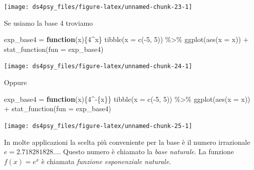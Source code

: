 \documentclass[
  11pt,
]{krantz}
\makeatletter
\newenvironment{Shaded}{\begin{snugshade}}{\end{snugshade}}
\newcommand{\AttributeTok}[1]{\textcolor[rgb]{0.61,0.61,0.61}{#1}}
\newcommand{\ControlFlowTok}[1]{\textcolor[rgb]{0.27,0.27,0.27}{\textbf{#1}}}
\newcommand{\DecValTok}[1]{\textcolor[rgb]{0.06,0.06,0.06}{#1}}
\newcommand{\FunctionTok}[1]{\textcolor[rgb]{0,0,0}{#1}}
\newcommand{\NormalTok}[1]{#1}
\newcommand{\OtherTok}[1]{\textcolor[rgb]{0.37,0.37,0.37}{#1}}
\newcommand{\SpecialCharTok}[1]{\textcolor[rgb]{0,0,0}{#1}}
\newenvironment{kframe}{%
\medskip{}
\setlength{\fboxsep}{.8em}
 \def\at@end@of@kframe{}%
 \ifinner\ifhmode%
  \def\at@end@of@kframe{\end{minipage}}%
  \begin{minipage}{\columnwidth}%
 \fi\fi%
 \def\FrameCommand##1{\hskip\@totalleftmargin \hskip-\fboxsep
 \colorbox{shadecolor}{##1}\hskip-\fboxsep
     \hskip-\linewidth \hskip-\@totalleftmargin \hskip\columnwidth}%
 \MakeFramed {\advance\hsize-\width
   \@totalleftmargin\z@ \linewidth\hsize
   \@setminipage}}%
 {\par\unskip\endMakeFramed%
 \at@end@of@kframe}
\renewenvironment{Shaded}{\begin{kframe}}{\end{kframe}}
\theoremstyle{definition}
\theoremstyle{definition}
\theoremstyle{definition}
\theoremstyle{definition}
\theoremstyle{remark}
\makeatother
\begin{document}
\begin{center}\texttt{[image: ds4psy\_files/figure-latex/unnamed-chunk-23-1]} \end{center}

Se usiamo la base 4 troviamo

\begin{Shaded}
\begin{Highlighting}[]
\NormalTok{exp\_base4 }\OtherTok{=} \ControlFlowTok{function}\NormalTok{(x)\{}\DecValTok{4}\SpecialCharTok{\^{}}\NormalTok{x\}}
\FunctionTok{tibble}\NormalTok{(}\AttributeTok{x =} \FunctionTok{c}\NormalTok{(}\SpecialCharTok{{-}}\DecValTok{5}\NormalTok{, }\DecValTok{5}\NormalTok{)) }\SpecialCharTok{\%\textgreater{}\%}
\FunctionTok{ggplot}\NormalTok{(}\FunctionTok{aes}\NormalTok{(}\AttributeTok{x =}\NormalTok{ x)) }\SpecialCharTok{+}
  \FunctionTok{stat\_function}\NormalTok{(}\AttributeTok{fun =}\NormalTok{ exp\_base4)}
\end{Highlighting}
\end{Shaded}

\begin{center}\texttt{[image: ds4psy\_files/figure-latex/unnamed-chunk-24-1]} \end{center}

Oppure

\begin{Shaded}
\begin{Highlighting}[]
\NormalTok{exp\_base4 }\OtherTok{=} \ControlFlowTok{function}\NormalTok{(x)\{}\DecValTok{4}\SpecialCharTok{\^{}{-}}\NormalTok{\{x\}\}}
\FunctionTok{tibble}\NormalTok{(}\AttributeTok{x =} \FunctionTok{c}\NormalTok{(}\SpecialCharTok{{-}}\DecValTok{5}\NormalTok{, }\DecValTok{5}\NormalTok{)) }\SpecialCharTok{\%\textgreater{}\%}
\FunctionTok{ggplot}\NormalTok{(}\FunctionTok{aes}\NormalTok{(}\AttributeTok{x =}\NormalTok{ x)) }\SpecialCharTok{+}
  \FunctionTok{stat\_function}\NormalTok{(}\AttributeTok{fun =}\NormalTok{ exp\_base4)}
\end{Highlighting}
\end{Shaded}

\begin{center}\texttt{[image: ds4psy\_files/figure-latex/unnamed-chunk-25-1]} \end{center}

In molte applicazioni la scelta più conveniente per la base è il numero irrazionale \(e = 2.718281828\dots\). Questo numero è chiamato la \emph{base naturale}. La funzione \(f(x) = e^x\) è chiamata \emph{funzione esponenziale naturale}.
\end{document}
